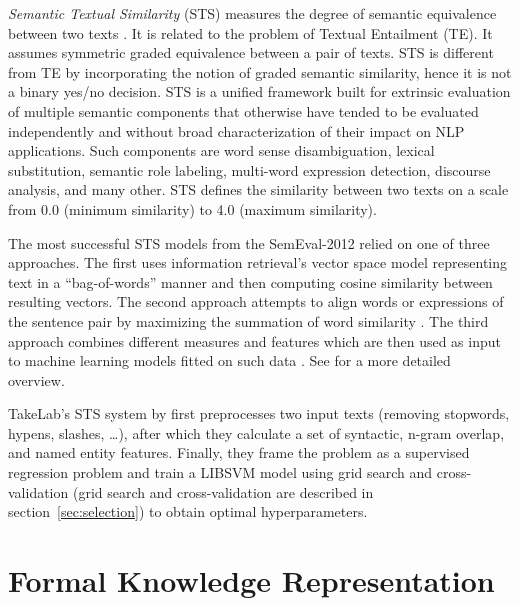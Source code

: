 \textit{Semantic  Textual  Similarity} (STS) measures the  degree  of  semantic
equivalence  between two texts \citep{agirre2012semeval}. It is related to the problem
of Textual Entailment (TE). It assumes symmetric graded equivalence between
a pair of texts. STS is different from TE by incorporating the notion of 
graded semantic similarity, hence it is not a binary yes/no decision. 
STS is a unified framework built for 
extrinsic evaluation of multiple semantic components that otherwise
have tended to be evaluated independently  and  without  broad
characterization  of their impact on NLP applications. 
Such components are word  sense  disambiguation, lexical  substitution,  semantic
role  labeling,  multi-word  expression  detection, discourse analysis, and 
many other. STS defines the similarity between two texts on a scale from 
0.0 (minimum similarity) to 4.0 (maximum similarity).

The most successful STS models from the SemEval-2012 relied on 
one of three approaches. The first uses information retrieval's 
vector space model \citep{meadow1992text} representing text in a 
``bag-of-words'' manner and then computing cosine similarity between 
resulting vectors. The second approach attempts to align words or expressions of
the sentence pair by maximizing the summation of word similarity \citep{mihalcea2006corpus}.
The third approach combines different measures and features which are then 
used as input to machine learning models fitted on such data 
\citep{vsaric2012takelab}. See \citep{han2013umbc_ebiquity}
for a more detailed overview. 

TakeLab's STS system by \citet{vsaric2012takelab} first preprocesses two input
texts (removing stopwords, hypens, slashes, \dots), after which they calculate
a set of syntactic, n-gram overlap, and named entity features.  Finally, they
frame the problem as a supervised regression problem and train a LIBSVM model
\citep{chang2011libsvm} using grid search and cross-validation (grid search and
cross-validation are described in
section~\ref{sec:selection}) to obtain optimal hyperparameters.

\section{Formal Knowledge Representation}
\label{sec:knowledge_representation}

